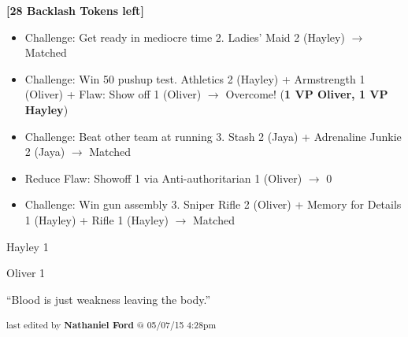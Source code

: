 \textbf{{[}28 Backlash Tokens left{]}}






\begin{itemize}
\item Challenge: Get ready in mediocre time 2.  Ladies' Maid 2 (Hayley) $\rightarrow$ Matched
\item Challenge: Win 50 pushup test. Athletics 2 (Hayley) + Armstrength 1 (Oliver) +  {\color[RGB]{255,0,0}Flaw: Show off 1}  (Oliver) $\rightarrow$ Overcome! (\textbf{1 VP Oliver, 1 VP Hayley})
\item Challenge: Beat other team at running 3.  Stash 2 (Jaya) + Adrenaline Junkie 2 (Jaya) $\rightarrow$ Matched
\item Reduce Flaw: Showoff 1 via Anti-authoritarian 1 (Oliver) $\rightarrow$ 0
\item Challenge: Win gun assembly 3. Sniper Rifle 2 (Oliver) + Memory for Details 1 (Hayley) + Rifle 1 (Hayley)  $\rightarrow$ Matched
\end{itemize}



Hayley 1

Oliver 1



``Blood is just weakness leaving the body.''

\vspace{\fill}


\begin{flushright}
\textsubscript{last edited by \textbf{Nathaniel Ford} @ 05/07/15 4:28pm}
\end{flushright}

